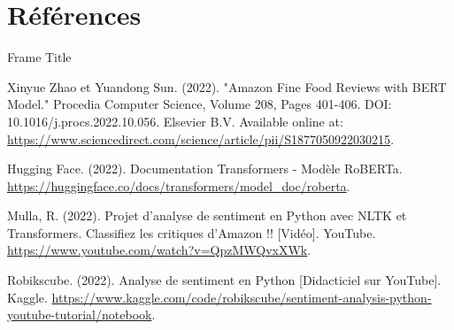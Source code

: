 
\section{Références}
\begin{frame}{Frame Title}
    \begin{thebibliography}{15}

Xinyue Zhao et Yuandong Sun. (2022). "Amazon Fine Food Reviews with BERT Model." Procedia Computer Science, Volume 208, Pages 401-406. DOI: 10.1016/j.procs.2022.10.056. Elsevier B.V. Available online at: \url{https://www.sciencedirect.com/science/article/pii/S1877050922030215}.

Hugging Face. (2022). Documentation Transformers - Modèle RoBERTa. \url{https://huggingface.co/docs/transformers/model_doc/roberta}.

Mulla, R. (2022). Projet d'analyse de sentiment en Python avec NLTK et  Transformers. Classifiez les critiques d'Amazon !! [Vidéo]. YouTube. \url{https://www.youtube.com/watch?v=QpzMWQvxXWk}.

Robikscube. (2022). Analyse de sentiment en Python  [Didacticiel sur YouTube]. Kaggle. \url{https://www.kaggle.com/code/robikscube/sentiment-analysis-python-youtube-tutorial/notebook}.


\end{thebibliography}
\end{frame}